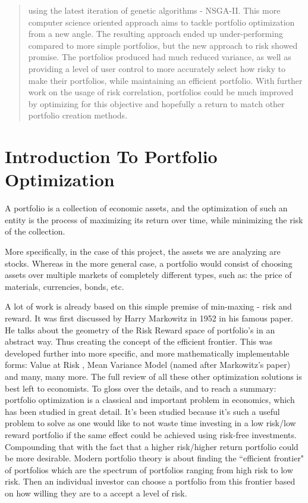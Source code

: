 \documentclass[11pt]{article}
\begin{document}
\begin{titlingpage}
\begin{abstract}
            using the latest iteration of genetic algorithms - NSGA-II.
            This more computer science oriented approach aims to tackle portfolio
            optimization from a new angle. The resulting approach ended up
            under-performing compared to more simple portfolios, but the new
            approach to risk showed promise. The portfolios produced had much reduced
            variance, as well as providing a level of user control to more accurately
            select how risky to make their portfolios, while maintaining an efficient
            portfolio. With further work on the usage of risk correlation, portfolios
            could be much improved by optimizing for this objective and hopefully
            a return to match other portfolio creation methods.
    \end{abstract}
\end{titlingpage}

\tableofcontents
\pagebreak

\section{Introduction To Portfolio Optimization}

    A portfolio is a collection of economic assets, and the optimization of such an
    entity is the process of maximizing its return over time, while minimizing the
    risk of the collection.

    More specifically, in the case of this project, the assets we are analyzing are
    stocks. Whereas in the more general case, a portfolio would consist of choosing
    assets over multiple markets of completely different types, such as: the price of 
    materials, currencies, bonds, etc.

    A lot of work is already based on this simple premise of min-maxing - risk and
    reward. It was first discussed by Harry Markowitz in 1952 \cite{Markowitz}
    in his famous paper. He talks about the geometry of the Risk Reward space
    of portfolio's in an abstract way. Thus creating the concept of the efficient frontier.
    This was developed further into more specific, and more mathematically implementable
    forms: Value at Risk \cite{ValueAtRisk, Ghaoui}, Mean Variance Model (named
    after Markowitz's paper) \cite{Robert, SidWard} and many, many more.
    The full review of all these other optimization solutions is best left
    to economists. To gloss over the details, and to reach a summary: portfolio
    optimization is a classical and important problem in economics, which has
    been studied in great detail. It's been studied because it's such a useful
    problem to solve as one would like to
    not waste time investing in a low risk/low reward portfolio if the same
    effect could be achieved using risk-free investments. Compounding
    that with the fact that a higher risk/higher return portfolio could
    be more desirable. Modern portfolio theory is about finding the ``efficient
    frontier" of portfolios which are the spectrum of portfolios ranging from
    high risk to low risk. Then an individual investor can choose a portfolio
    from this frontier based on how willing they are to a accept a level of
    risk.
\end{document}
